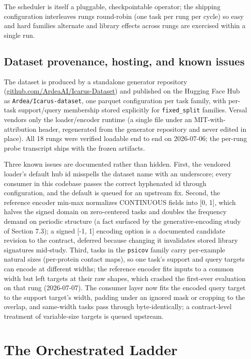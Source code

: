 \documentclass[11pt]{article}
\begin{document}
The scheduler is itself a pluggable, checkpointable operator; the shipping configuration interleaves rungs round-robin (one task per rung per cycle) so easy and hard families alternate and library effects across rungs are exercised within a single run.

\subsection{Dataset provenance, hosting, and known issues}

The dataset is produced by a standalone generator repository (\url{github.com/ArdeaAI/Icarus-Dataset}) and published on the Hugging Face Hub as \texttt{Ardea/Icarus-dataset}, one parquet configuration per task family, with per-task support/query membership stored explicitly for \texttt{fixed_split} families. Versal vendors only the loader/encoder runtime (a single file under an MIT-with-attribution header, regenerated from the generator repository and never edited in place). All 18 rungs were verified loadable end to end on 2026-07-06; the per-rung probe transcript ships with the frozen artifacts.

Three known issues are documented rather than hidden. First, the vendored loader's default hub id misspells the dataset name with an underscore; every consumer in this codebase passes the correct hyphenated id through configuration, and the default is queued for an upstream fix. Second, the reference encoder min-max normalizes CONTINUOUS fields into [0, 1], which halves the signed domain on zero-centered tasks and doubles the frequency demand on periodic structure (a fact surfaced by the generative-encoding study of Section 7.3); a signed [-1, 1] encoding option is a documented candidate revision to the contract, deferred because changing it invalidates stored library signatures mid-study. Third, tasks in the \texttt{psicov} family carry per-example natural sizes (per-protein contact maps), so one task's support and query targets can encode at different widths; the reference encoder fits inputs to a common width but left targets at their raw shapes, which crashed the first-ever evaluation on that rung (2026-07-07). The consumer layer now fits the encoded query target to the support target's width, padding under an ignored mask or cropping to the overlap, and same-width tasks pass through byte-identically; a contract-level treatment of variable-size targets is queued upstream.

\section{The Orchestrated Ladder}
\end{document}
